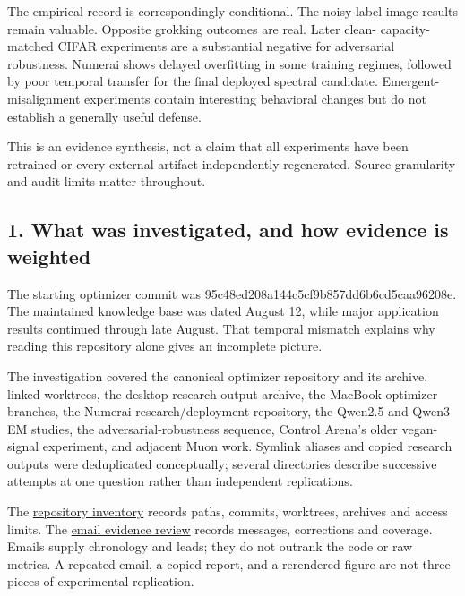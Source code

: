 \documentclass[
  british,
  10pt,
  a4paper,
]{article}
\begin{document}
The empirical record is correspondingly conditional.\allowbreak{} The
noisy-\allowbreak{}label image results remain valuable. Opposite
grokking outcomes are real. Later clean- capacity-\allowbreak{}matched
CIFAR experiments are a substantial negative for adversarial
robustness.\allowbreak{} Numerai shows delayed overfitting in some
training regimes, followed by poor temporal transfer for the final
deployed spectral candidate. Emergent- misalignment experiments contain
interesting behavioral changes but do not establish a generally useful
defense.

This is an evidence synthesis, not a claim that all experiments have
been retrained or every external artifact independently
regenerated.\allowbreak{} Source granularity and audit limits matter
throughout.\allowbreak{}

\subsection{\texorpdfstring{1. What was
investigated\allowbreak{},\allowbreak{} and how evidence is
weighted}{1. What was  and how evidence is weighted}}\label{synthesis--what-was-investigated-and-how-evidence-is-weighted}

The starting optimizer commit was
95c48ed208a1\allowbreak{}44c5cf9b857d\allowbreak{}d6b6cd5caa96\allowbreak{}208e.\allowbreak{}
The maintained knowledge base was dated August 12, while major
application results continued through late August. That temporal
mismatch explains why reading this repository alone gives an incomplete
picture.

The investigation covered the canonical optimizer repository and its
archive, linked worktrees, the desktop research-\allowbreak{}output
archive, the MacBook optimizer branches, the Numerai
research/\allowbreak{}deployment repository,\allowbreak{} the Qwen2.5
and Qwen3 EM studies, the adversarial-\allowbreak{}robustness sequence,
Control Arena's older vegan-\allowbreak{}signal experiment,\allowbreak{}
and adjacent Muon work. Symlink aliases and copied research outputs were
deduplicated conceptually; several directories describe successive
attempts at one question rather than independent
replications\allowbreak{}.\allowbreak{}

The \hyperref[repository-inventory]{repository inventory} records paths,
commits, worktrees, archives and access limits. The
\hyperref[email-evidence]{email evidence review} records messages,
corrections and coverage. Emails supply chronology and leads; they do
not outrank the code or raw metrics. A repeated email, a copied report,
and a rerendered figure are not three pieces of experimental
replication.\allowbreak{}
\end{document}
